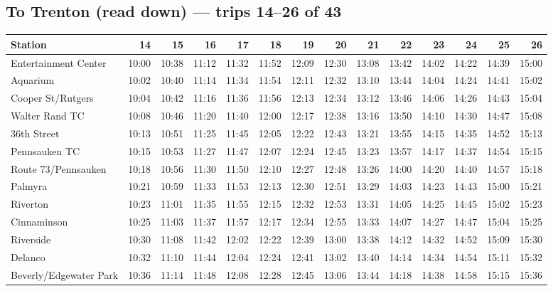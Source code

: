 \subsection*{To Trenton (read down) --- trips 14--26 of 43}
\begin{center}\footnotesize\setlength{\tabcolsep}{3pt}\begin{tabular}{@{}lrrrrrrrrrrrrr@{}}\toprule
Station & 14 & 15 & 16 & 17 & 18 & 19 & 20 & 21 & 22 & 23 & 24 & 25 & 26 \\\midrule
Entertainment Center & 10:00 & 10:38 & 11:12 & 11:32 & 11:52 & 12:09 & 12:30 & 13:08 & 13:42 & 14:02 & 14:22 & 14:39 & 15:00 \\
Aquarium & 10:02 & 10:40 & 11:14 & 11:34 & 11:54 & 12:11 & 12:32 & 13:10 & 13:44 & 14:04 & 14:24 & 14:41 & 15:02 \\
Cooper St/Rutgers & 10:04 & 10:42 & 11:16 & 11:36 & 11:56 & 12:13 & 12:34 & 13:12 & 13:46 & 14:06 & 14:26 & 14:43 & 15:04 \\
Walter Rand TC & 10:08 & 10:46 & 11:20 & 11:40 & 12:00 & 12:17 & 12:38 & 13:16 & 13:50 & 14:10 & 14:30 & 14:47 & 15:08 \\
36th Street & 10:13 & 10:51 & 11:25 & 11:45 & 12:05 & 12:22 & 12:43 & 13:21 & 13:55 & 14:15 & 14:35 & 14:52 & 15:13 \\
Pennsauken TC & 10:15 & 10:53 & 11:27 & 11:47 & 12:07 & 12:24 & 12:45 & 13:23 & 13:57 & 14:17 & 14:37 & 14:54 & 15:15 \\
Route 73/Pennsauken & 10:18 & 10:56 & 11:30 & 11:50 & 12:10 & 12:27 & 12:48 & 13:26 & 14:00 & 14:20 & 14:40 & 14:57 & 15:18 \\
Palmyra & 10:21 & 10:59 & 11:33 & 11:53 & 12:13 & 12:30 & 12:51 & 13:29 & 14:03 & 14:23 & 14:43 & 15:00 & 15:21 \\
Riverton & 10:23 & 11:01 & 11:35 & 11:55 & 12:15 & 12:32 & 12:53 & 13:31 & 14:05 & 14:25 & 14:45 & 15:02 & 15:23 \\
Cinnaminson & 10:25 & 11:03 & 11:37 & 11:57 & 12:17 & 12:34 & 12:55 & 13:33 & 14:07 & 14:27 & 14:47 & 15:04 & 15:25 \\
Riverside & 10:30 & 11:08 & 11:42 & 12:02 & 12:22 & 12:39 & 13:00 & 13:38 & 14:12 & 14:32 & 14:52 & 15:09 & 15:30 \\
Delanco & 10:32 & 11:10 & 11:44 & 12:04 & 12:24 & 12:41 & 13:02 & 13:40 & 14:14 & 14:34 & 14:54 & 15:11 & 15:32 \\
Beverly/Edgewater Park & 10:36 & 11:14 & 11:48 & 12:08 & 12:28 & 12:45 & 13:06 & 13:44 & 14:18 & 14:38 & 14:58 & 15:15 & 15:36 \\

\end{tabular}
\end{center}
